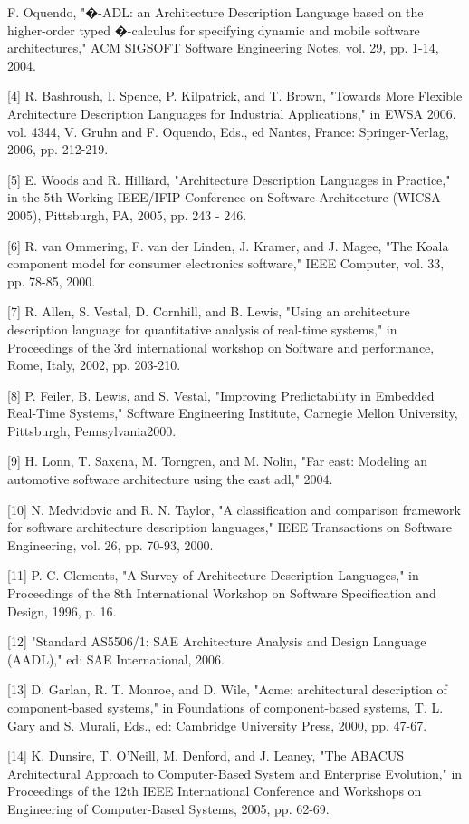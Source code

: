 \begin{itemise}
[3]	F. Oquendo, "�-ADL: an Architecture Description Language based on the higher-order typed �-calculus for specifying dynamic and mobile software architectures," ACM SIGSOFT Software Engineering Notes, vol. 29, pp. 1-14, 2004.

[4]	R. Bashroush, I. Spence, P. Kilpatrick, and T. Brown, "Towards More Flexible Architecture Description Languages for Industrial Applications," in EWSA 2006. vol. 4344, V. Gruhn and F. Oquendo, Eds., ed Nantes, France: Springer-Verlag, 2006, pp. 212-219.

[5]	E. Woods and R. Hilliard, "Architecture Description Languages in Practice," in the 5th Working IEEE/IFIP Conference on Software Architecture (WICSA 2005), Pittsburgh, PA, 2005, pp. 243 - 246.

[6]	R. van Ommering, F. van der Linden, J. Kramer, and J. Magee, "The Koala component model for consumer electronics software," IEEE Computer, vol. 33, pp. 78-85, 2000.

[7]	R. Allen, S. Vestal, D. Cornhill, and B. Lewis, "Using an architecture description language for quantitative analysis of real-time systems," in Proceedings of the 3rd international workshop on Software and performance, Rome, Italy, 2002, pp. 203-210.

[8]	P. Feiler, B. Lewis, and S. Vestal, "Improving Predictability in Embedded Real-Time Systems," Software Engineering Institute, Carnegie Mellon University, Pittsburgh, Pennsylvania2000.

[9]	H. Lonn, T. Saxena, M. Torngren, and M. Nolin, "Far east: Modeling an automotive software architecture using the east adl," 2004.

[10]	N. Medvidovic and R. N. Taylor, "A classification and comparison framework for software architecture description languages," IEEE Transactions on Software Engineering, vol. 26, pp. 70-93, 2000.

[11]	P. C. Clements, "A Survey of Architecture Description Languages," in Proceedings of the 8th International Workshop on Software Specification and Design, 1996, p. 16.

[12]	"Standard AS5506/1: SAE Architecture Analysis and Design Language (AADL)," ed: SAE International, 2006.

[13]	D. Garlan, R. T. Monroe, and D. Wile, "Acme: architectural description of component-based systems," in Foundations of component-based systems, T. L. Gary and S. Murali, Eds., ed: Cambridge University Press, 2000, pp. 47-67.

[14]	K. Dunsire, T. O'Neill, M. Denford, and J. Leaney, "The ABACUS Architectural Approach to Computer-Based System and Enterprise Evolution," in Proceedings of the 12th IEEE International Conference and Workshops on Engineering of Computer-Based Systems, 2005, pp. 62-69.


\end{itemise}
